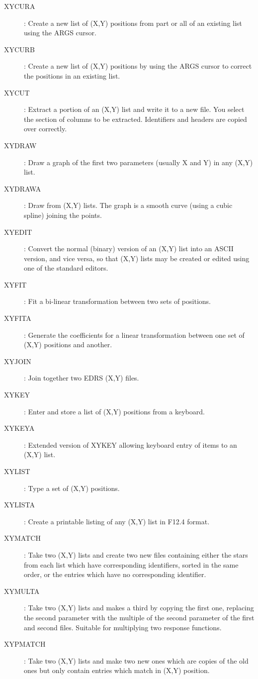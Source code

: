 \begin{description}
\item [XYCURA]: Create a new list of (X,Y) positions from part or all of an
existing list using the ARGS cursor.
\item [XYCURB]: Create a new list of (X,Y) positions by using the ARGS cursor to
correct the positions in an existing list.
\item [XYCUT]: Extract a portion of an (X,Y) list and write it to a new file.
You select the section of columns to be extracted.
Identifiers and headers are copied over correctly.
\item [XYDRAW]: Draw a graph of the first two parameters (usually X and Y) in
any (X,Y) list.
\item [XYDRAWA]: Draw from (X,Y) lists.
The graph is a smooth curve (using a cubic spline) joining the points.
\item [XYEDIT]: Convert the normal (binary) version of an (X,Y) list into an
ASCII version, and vice versa, so that (X,Y) lists may be created or edited
using one of the standard editors.
\item [XYFIT]: Fit a bi-linear transformation between two sets of positions.
\item [XYFITA]: Generate the coefficients for a linear transformation between
one set of (X,Y) positions and another.
\item [XYJOIN]: Join together two EDRS (X,Y) files.
\item [XYKEY]: Enter and store a list of (X,Y) positions from a keyboard.
\item [XYKEYA]: Extended version of XYKEY allowing keyboard entry of items to an
(X,Y) list.
\item [XYLIST]: Type a set of (X,Y) positions.
\item [XYLISTA]: Create a printable listing of any (X,Y) list in F12.4 format.
\item [XYMATCH]: Take two (X,Y) lists and create two new files containing
either the stars from each list which have corresponding identifiers, sorted
in the same order, or the entries which have no corresponding identifier.
\item [XYMULTA]: Take two (X,Y) lists and makes a third by copying the first
one, replacing the second parameter with the multiple of the second parameter
of the first and second files.
Suitable for multiplying two response functions.
\item [XYPMATCH]: Take two (X,Y) lists and make two new ones which are copies
of the old ones but only contain entries which match in (X,Y) position.

\end{description}
